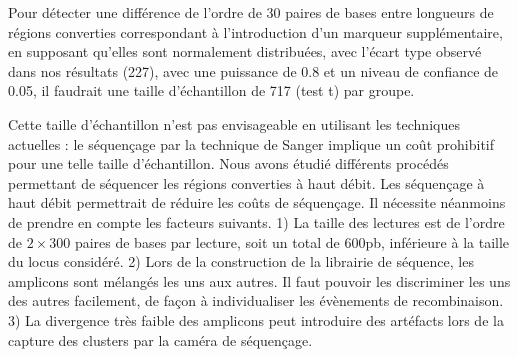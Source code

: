 Pour détecter une différence de l'ordre de \num{30} paires de bases entre
longueurs de régions converties correspondant à l'introduction d'un marqueur
supplémentaire, en supposant qu'elles sont normalement distribuées, avec l'écart
type observé dans nos résultats (\num{227}), avec une puissance de \num{0.8} et
un niveau de confiance de \num{0.05}, il faudrait une taille d'échantillon de
\num{717} (test \textrm{t}) par groupe.

Cette taille d'échantillon n'est pas envisageable en utilisant les techniques
actuelles : le séquençage par la technique de Sanger implique un coût prohibitif
pour une telle taille d'échantillon. Nous avons étudié différents procédés
permettant de séquencer les régions converties à haut débit. Les séquençage à
haut débit permettrait de réduire les coûts de séquençage. Il nécessite
néanmoins de prendre en compte les facteurs suivants. 1) La taille des lectures
est de l'ordre de \(2 \times 300\) paires de bases par lecture, soit un total de
\(600\)pb, inférieure à la taille du locus considéré. 2) Lors de la
construction de la librairie de séquence, les amplicons sont mélangés les uns
aux autres. Il faut pouvoir les discriminer les uns des autres facilement, de
façon à individualiser les évènements de recombinaison. 3) La divergence très
faible des amplicons peut introduire des artéfacts lors de la capture des
clusters par la caméra de séquençage.




\afterpage{\blankpage}
